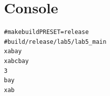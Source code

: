 









\pagebreak

\section{Console}

\begin{alltt}
# make build PRESET=release
# build/release/lab5/lab5_main
xabay
xabcbay
3
bay
xab
\end{alltt}

\pagebreak
